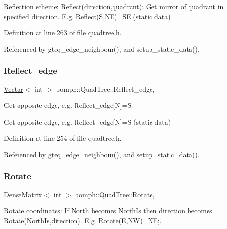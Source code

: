 Reflection scheme\+: Reflect(direction,quadrant)\+: Get mirror of quadrant in specified direction. E.\+g. Reflect(\+S,\+N\+E)=SE (static data) 

Definition at line 263 of file quadtree.\+h.



Referenced by gteq\+\_\+edge\+\_\+neighbour(), and setup\+\_\+static\+\_\+data().

\mbox{\label{classoomph_1_1QuadTree_a40d403ca6058b1f8cdef2e0b21972050}} 
\subsubsection{\texorpdfstring{Reflect\+\_\+edge}{Reflect\_edge}}
{\footnotesize\ttfamily \hyperlink{classoomph_1_1Vector}{Vector}$<$ int $>$ oomph\+::\+Quad\+Tree\+::\+Reflect\+\_\+edge\hspace{0.3cm}{\ttfamily [static]}, {\ttfamily [private]}}



Get opposite edge, e.\+g. Reflect\+\_\+edge\mbox{[}N\mbox{]}=S. 

Get opposite edge, e.\+g. Reflect\+\_\+edge\mbox{[}N\mbox{]}=S (static data) 

Definition at line 254 of file quadtree.\+h.



Referenced by gteq\+\_\+edge\+\_\+neighbour(), and setup\+\_\+static\+\_\+data().

\mbox{\label{classoomph_1_1QuadTree_a55ea0e64281aef7e8f8b521ec3b0a956}} 
\subsubsection{\texorpdfstring{Rotate}{Rotate}}
{\footnotesize\ttfamily \hyperlink{classoomph_1_1DenseMatrix}{Dense\+Matrix}$<$ int $>$ oomph\+::\+Quad\+Tree\+::\+Rotate\hspace{0.3cm}{\ttfamily [static]}, {\ttfamily [private]}}



Rotate coordinates\+: If North becomes North\+Is then direction becomes Rotate(\+North\+Is,direction). E.\+g. Rotate(\+E,\+N\+W)=NE;. 

